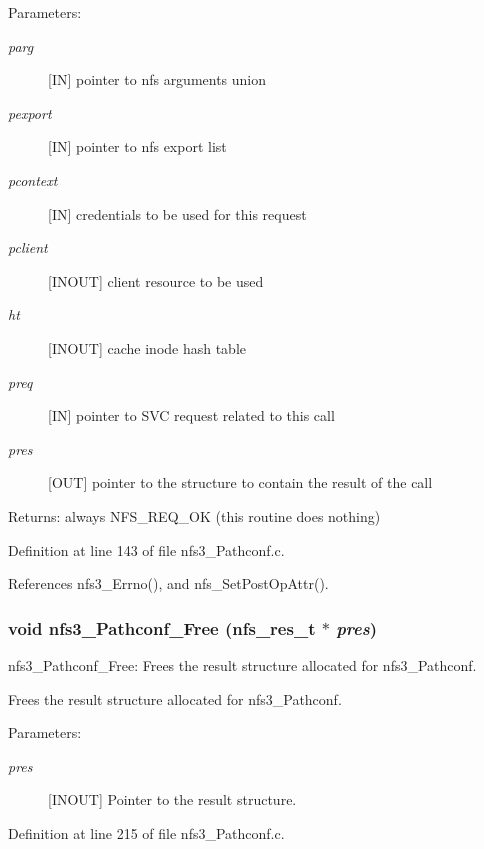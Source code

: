 \begin{Desc}
\item[Parameters:]
\begin{description}
\item[{\em parg}][IN] pointer to nfs arguments union \item[{\em pexport}][IN] pointer to nfs export list \item[{\em pcontext}][IN] credentials to be used for this request \item[{\em pclient}][INOUT] client resource to be used \item[{\em ht}][INOUT] cache inode hash table \item[{\em preq}][IN] pointer to SVC request related to this call \item[{\em pres}][OUT] pointer to the structure to contain the result of the call\end{description}
\end{Desc}
\begin{Desc}
\item[Returns:]always NFS\_\-REQ\_\-OK (this routine does nothing) \end{Desc}


Definition at line 143 of file nfs3\_\-Pathconf.c.

References nfs3\_\-Errno(), and nfs\_\-Set\-Post\-Op\-Attr().
\subsubsection{\setlength{\rightskip}{0pt plus 5cm}void nfs3\_\-Pathconf\_\-Free (nfs\_\-res\_\-t $\ast$ {\em pres})}\label{nfs3__Pathconf_8c_a1}


nfs3\_\-Pathconf\_\-Free: Frees the result structure allocated for nfs3\_\-Pathconf.

Frees the result structure allocated for nfs3\_\-Pathconf.

\begin{Desc}
\item[Parameters:]
\begin{description}
\item[{\em pres}][INOUT] Pointer to the result structure. \end{description}
\end{Desc}


Definition at line 215 of file nfs3\_\-Pathconf.c.